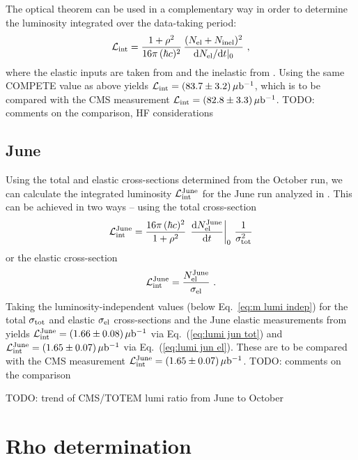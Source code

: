 \documentclass[doublecol]{../macros/epl2}
\def\d{{\rm d}}
\def\un#1{\,{\rm #1}}
\begin{document}
The optical theorem can be used in a complementary way in order to determine the luminosity integrated over the data-taking period:
\begin{equation}
\label{eq:lumi oct}
{\cal L_{\rm int}} = {1 + \rho^2 \over 16\pi\, (\hbar c)^2}\, { (N_{\rm el} + N_{\rm inel})^2 \over \d N_{\rm el}/\d t|_0 }\ ,
\end{equation}
where the elastic inputs are taken from \cite{P1} and the inelastic from \cite{P2}. Using the same COMPETE value as above yields ${\cal L_{\rm int}} = (83.7 \pm 3.2) \un{\mu b^{-1}}$, which is to be compared with the CMS measurement ${\cal L_{\rm int}} = (82.8 \pm 3.3) \un{\mu b^{-1}}$. TODO: comments on the comparison, HF considerations

\subsection{June}

Using the total and elastic cross-sections determined from the October run, we can calculate the integrated luminosity ${\cal L}_{\rm int}^{\rm June}$ for the June run analyzed in \cite{epl96}. This can be achieved in two ways -- using the total cross-section
\begin{equation}
\label{eq:lumi jun tot}
{\cal L}_{\rm int}^{\rm June} =  {16\pi\, (\hbar c)^2\over 1 + \rho^2}\, \left. \d N_{\rm el}^{\rm June}\over\d t\right|_0\, {1\over \sigma_{\rm tot}^2}
\end{equation}
or the elastic cross-section
\begin{equation}
\label{eq:lumi jun el}
{\cal L}_{\rm int}^{\rm June} = {N_{\rm el}^{\rm June}\over \sigma_{\rm el}}\ .
\end{equation}
Taking the luminosity-independent values (below Eq.~\ref{eq:m lumi indep}) for the total $\sigma_{\rm tot}$ and elastic $\sigma_{\rm el}$ cross-sections and the June elastic measurements from \cite{epl96} yields
${\cal L}_{\rm int}^{\rm June} = (1.66 \pm 0.08)\un{\mu b^{-1}}$ via Eq.~(\ref{eq:lumi jun tot}) and
${\cal L}_{\rm int}^{\rm June} = (1.65 \pm 0.07)\un{\mu b^{-1}}$ via Eq.~(\ref{eq:lumi jun el}). These are to be compared with the CMS measurement
${\cal L}_{\rm int}^{\rm June} = (1.65 \pm 0.07)\un{\mu b^{-1}}$. TODO: comments on the comparison

TODO: trend of CMS/TOTEM lumi ratio from June to October



\section{Rho determination}
\end{document}

